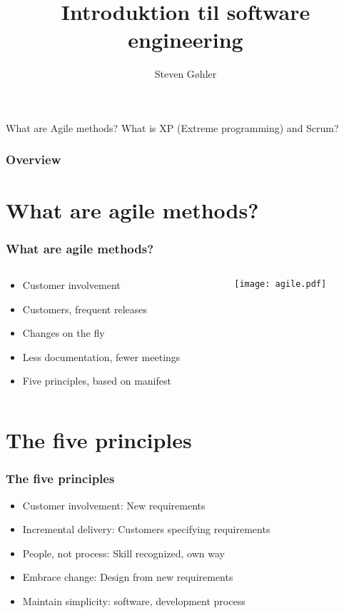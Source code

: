 \documentclass{beamer}
\title{Introduktion til software engineering}
\author{Steven Gøhler}
\begin{document}
\begin{frame}
\titlepage
What are Agile methods? What is XP (Extreme programming) and Scrum?

\end{frame}

\begin{frame}
\frametitle{Overview}
\tableofcontents
\end{frame}

\section{What are agile methods?}
\begin{frame}
\frametitle{What are agile methods?}
  \begin{columns}[T]
    \begin{column}{.5\textwidth}
	  \begin{itemize}
		\item Customer involvement 
		\item Customers, frequent releases
		\item Changes on the fly
		\item Less documentation, fewer meetings
		\item Five principles, based on manifest
	  \end{itemize}
    \end{column}
    \begin{column}{.5\textwidth}
      \texttt{[image: agile.pdf]}
    \end{column}
  \end{columns}
\end{frame}


\section{The five principles}
\begin{frame}
  \frametitle{The five principles}
  \begin{itemize}
	\item Customer involvement: New requirements
	\item Incremental delivery: Customers specifying requirements
	\item People, not process: Skill recognized, own way
	\item Embrace change: Design from new requirements
	\item Maintain simplicity: software, development process
  \end{itemize}
\end{frame}
\end{document}

